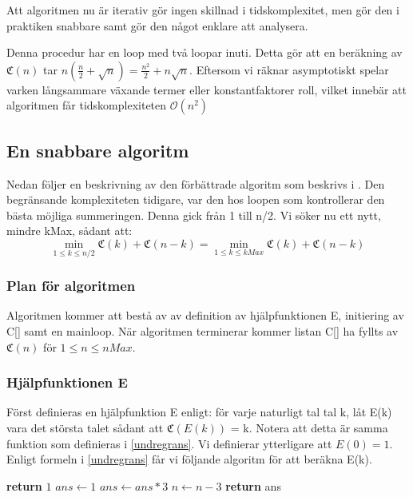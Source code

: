 \documentclass[a4paper,titlepage,swedish]{article}
\newcommand{\C}[1]{\mathfrak C \left( #1 \right)}
\renewcommand{\O}{\mathcal {O}}
\theoremstyle{definition}
\begin{document}
    Att algoritmen nu är iterativ gör ingen skillnad i tidskomplexitet, men gör
    den i praktiken snabbare samt gör den något enklare att analysera.

    Denna procedur har en loop med två loopar inuti. Detta gör att en beräkning av
    $\C{n}$ tar $n\left(\frac{n}{2}+\sqrt n\right) = \frac{n^2}{2} + n\sqrt n$.
    Eftersom vi räknar asymptotiskt spelar varken långsammare växande termer eller
    konstantfaktorer roll,  vilket innebär att algoritmen får tidskomplexiteten
    $\O(n^2)$

    \subsection{En snabbare algoritm}
    Nedan följer en beskrivning av den förbättrade algoritm som beskrivs i \cite{algorithm_lune}.
    Den begränsande komplexiteten tidigare, var den hos loopen som kontrollerar den bästa möjliga summeringen. Denna gick från 1 till n/2. Vi söker nu ett nytt, mindre kMax, sådant att:
    $$\min\limits_{1 \leq k \leq n/2} \C{k} + \C{n-k} = \min\limits_{1 \leq k \leq kMax} \C{k} + \C{n-k}$$


    \subsubsection{Plan för algoritmen}
    Algoritmen kommer att bestå av av definition av hjälpfunktionen E, initiering av C[] samt en mainloop. När algoritmen terminerar kommer listan C[] ha fyllts av $\C{n}$ för
    $1 \leq n \leq nMax$. 

    \subsubsection{Hjälpfunktionen E}
    Först definieras en hjälpfunktion E enligt: för varje naturligt tal tal k, låt E(k) vara det största talet sådant att $\C{E(k)}$ = k.
    Notera att detta är samma funktion som definieras i \cref{undregrans}. Vi definierar ytterligare att $E(0) = 1$. Enligt formeln i \cref{undregrans} får vi följande algoritm för att beräkna E(k).

    \begin{algorithm}[H]
        \caption{$\O$}
        \begin{algorithmic}[1]
                    \State \textbf{return} $1$
                \EndIf
                \State $ans \gets 1$
                    \State $ans \gets ans*3$
                    \State $n \gets n-3$
                \EndWhile
            \State \textbf{return} ans
            \EndProcedure
        \end{algorithmic}
    \end{algorithm}
\end{document}
